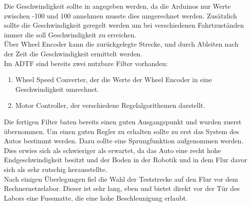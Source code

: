 \documentclass[a4paper,12pt]{report}
\begin{document}
	Die Geschwindigkeit sollte in \meter\per\second\usk angegeben werden, da die Arduinos nur Werte zwischen -100 und 100 annehmen musste dies umgerechnet werden. Zusätzlich sollte die Geschwindigkeit geregelt werden um bei verschiedenen Fahrtzuständen immer die soll Geschwindigkeit zu erreichen. \\
	Über Wheel Encoder kann die zurückgelegte Strecke, und durch Ableiten nach der Zeit die Geschwindigkeit ermittelt werden. \\
	Im ADTF sind bereits zwei nutzbare Filter vorhanden:
	\begin{enumerate}[label=]
		\item Wheel Speed Converter, der die Werte der Wheel Encoder in eine Geschwindigkeit umrechnet. \\
		\item Motor Controller, der verschiedene Regelalgorithemen darstellt.	%
	\end{enumerate}
	Die fertigen Filter baten bereits einen guten Ausgangspunkt und wurden zuerst übernommen. Um einen guten Regler zu erhalten sollte zu erst das System des Autos bestimmt werden. Dazu sollte eine Sprungfunktion aufgenommen werden. Dies erwies sich als schwieriger als erwartet, da das Auto eine recht hohe Endgeschwindigkeit besitzt und der Boden in der Robotik und in dem Flur davor sich als sehr rutschig herausstellte. \\
	Nach einigen Überlegungen fiel die Wahl der Teststrecke auf den Flur vor dem Rechnernetzelabor. Dieser ist sehr lang, eben und bietet direkt vor der Tür des Labors eine Fussmatte, die eine hohe Beschleunigung erlaubt. \\
\end{document}
